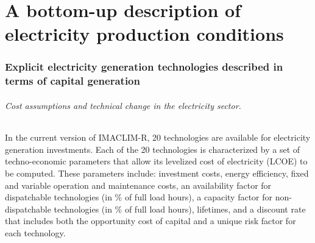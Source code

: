 \part*{A bottom-up description of electricity production conditions}

\section{Explicit electricity generation technologies described in terms of capital generation}

\paragraph{ Cost assumptions and technical change in the electricity sector.} In the current version of IMACLIM-R, 20 technologies are available for electricity generation investments. Each of the  20  technologies is characterized by a set of techno-economic parameters that allow its levelized cost of electricity (LCOE) to be computed. These parameters include: investment costs, energy efficiency, fixed and variable operation and maintenance costs, an availability factor for dispatchable technologies (in \% of full load hours), a capacity factor for non-dispatchable technologies (in \% of full load hours), lifetimes, and a discount rate that includes both the opportunity cost of capital and a unique risk factor for each technology.

